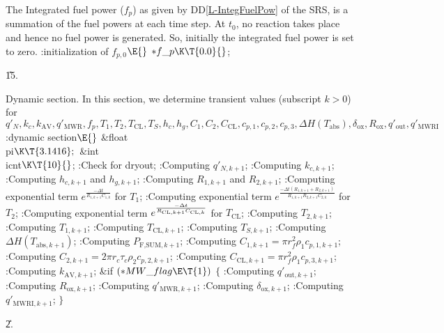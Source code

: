 \documentclass[letterpaper,12pt,baseclass=report]{cweb-hy}
\begin{document}
{
The Integrated fuel power ($f_p$) as given by DD\ref{L-IntegFuelPow}
of the SRS, is a summation of the fuel powers at each time step.
At $t_0$, no reaction takes place and hence no fuel power is generated. So,
initially
the integrated fuel power is set to zero.
\Y\B\4:initialization of $f_{p,0}$\X${}\E{}$\6
${*}\\{f\_p}\K\T{0.0}{}$;\par
\U15.\fi

\fi

Dynamic section.
In this section, we determine transient values (subscript $k>0$) for
\[
q'_N,k_c,k_{\text{AV}},q'_{\mathrm{MWR}}, f_p,
T_1, T_2, T_{\mathrm{CL}}, T_S, h_c, h_g, C_1,
C_2,C_{\text{CL}},c_{p,1},c_{p,2},c_{p,3},\Delta H(T_{\text{abs}}),
\delta_{\text{ox}},R_{\text{ox}}, q'_{\text{out}},q'_{\mathrm{MWRI}}
\]
\Y\B\4:dynamic section\X${}\E{}$\6
\&{float} \\{pi}${}\K\T{3.1416};{}$\6
\&{int} \\{icnt}${}\K\T{10}{}$;\7
:Check for dryout\X;\6
:Computing $q'_{N,k+1}$\X;\6
:Computing $k_{c,k+1}$\X;\6
:Computing $h_{c,k+1}$ and $h_{g,k+1}$\X;\6
:Computing $R_{1,k+1}$ and $R_{2,k+1}$\X;\6
:Computing exponential term $e^{\frac{-\Delta t}{R_{1,k+1} C_{1,k}}}$ for
$T_1$\X;\6
:Computing exponential term $e^{\frac{-\Delta t (R_{1,k+1} +
R_{2,k+1})}{R_{1,k+1} R_{2,k+1} C_{2,k}}}$ for $T_2$\X;\6
:Computing exponential term $e^{\frac{-\Delta t}{R_{\text{CL},k+1} C_{%
\text{CL},k}}}$ for $T_{\text{CL}}$\X;\6
:Computing $T_{2,k+1}$\X;\6
:Computing $T_{1,k+1}$\X;\6
:Computing $T_{\text{CL},k+1}$\X;\6
:Computing $T_{S,k+1}$\X;\6
:Computing $\Delta H (T_{\text{abs},k+1})$\X;\6
:Computing $P_{\text{F,SUM},k+1}$\X;\6
:Computing $C_{1,k+1} =\pi r_f^2 \rho_1 c_{p,1,k+1}$\X;\6
:Computing $C_{2,k+1} =2 \pi r_c \tau_c \rho_2 c_{p,2,k+1}$\X;\6
:Computing $C_{\text{CL},k+1} = \pi r_f ^2 \rho_ 1 c_{p,3,k+1}$\X;\6
:Computing $k_{\mathrm{AV},k+1}$\X;\6
\&{if} ${}({*}\\{MW\_flag}\E\T{1}){}$\5
${}\{{}$\1\6
:Computing $q'_{\text{out},k+1}$\X;\6
:Computing $R_{\text{ox},k+1}$\X;\6
:Computing $q'_{\mathrm{MWR},k+1}$\X;\6
:Computing $\delta_{\mathrm{ox},k+1}$\X;\6
:Computing $q'_{\mathrm{MWRI},k+1}$\X;\6
\4${}\}{}$\2\par
\U2.\fi

\fi

}
\end{document}
